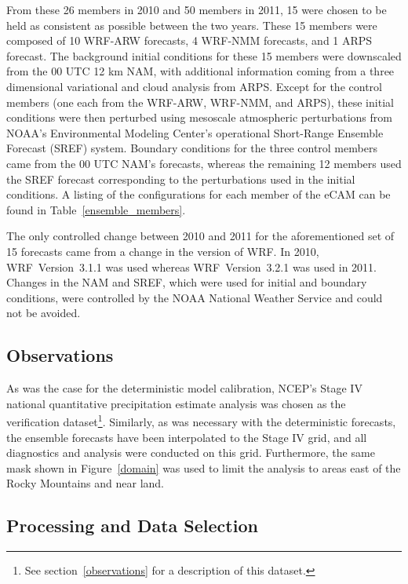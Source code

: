 From these 26 members in 2010 and 50 members in 2011, 15 were chosen to be held as consistent as possible between the two years.
These 15 members were composed of 10 WRF-ARW forecasts, 4 WRF-NMM forecasts, and 1 ARPS forecast.
The background initial conditions for these 15 members were downscaled from the 00 UTC 12 km NAM, with additional information coming from a three dimensional variational and cloud analysis from ARPS.
Except for the control members (one each from the WRF-ARW, WRF-NMM, and ARPS), these initial conditions were then perturbed using mesoscale atmospheric perturbations from NOAA's Environmental Modeling Center's operational Short-Range Ensemble Forecast (SREF) system.
Boundary conditions for the three control members came from the 00 UTC NAM's forecasts, whereas the remaining 12 members used the SREF forecast corresponding to the perturbations used in the initial conditions.
A listing of the configurations for each member of the eCAM can be found in \mbox{Table \ref{ensemble_members}}.


The only controlled change between 2010 and 2011 for the aforementioned set of 15 forecasts came from a change in the version of WRF. In 2010, \mbox{WRF Version 3.1.1} was used whereas \mbox{WRF Version 3.2.1} was used in 2011.
Changes in the NAM and SREF, which were used for initial and boundary conditions, were controlled by the NOAA National Weather Service and could not be avoided.




\subsection{Observations}
\label{eobservations}

As was the case for the deterministic model calibration, NCEP's Stage IV national quantitative precipitation estimate analysis was chosen as the verification dataset\footnote{See \mbox{section \ref{observations}} for a description of this dataset.}.
Similarly, as was necessary with the deterministic forecasts, the ensemble forecasts have been interpolated to the Stage IV grid, and all diagnostics and analysis were conducted on this grid.
Furthermore, the same mask shown in \mbox{Figure \ref{domain}} was used to limit the analysis to areas east of the Rocky Mountains and near land.




\subsection{Processing and Data Selection}
\label{eprocessing}




